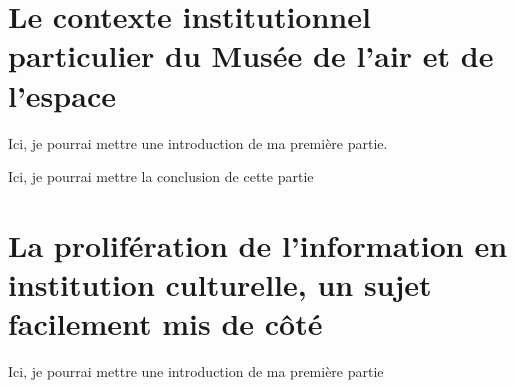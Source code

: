 \documentclass[12pt,twoside]{book}
\begin{document}
 



\newpage{\pagestyle{empty}\cleardoublepage}


	\mainmatter


	\part{Le contexte institutionnel particulier du Musée de l'air et de l'espace}


Ici, je pourrai mettre une introduction de ma première partie.


 



Ici, je pourrai mettre la conclusion de cette partie

	
	\part{La prolifération de l’information en institution culturelle, un sujet facilement mis de côté}
	

	Ici, je pourrai mettre une introduction de ma première partie
	
	
	
	
	
\end{document}

